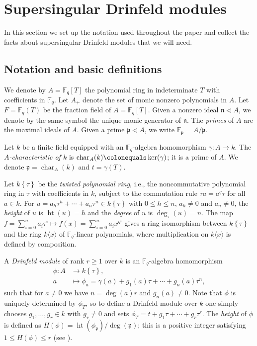 \documentclass[12pt]{amsart}
\theoremstyle{definition}
\theoremstyle{remark}
\numberwithin{equation}{section}
\numberwithin{thm}{section}
\DeclareMathOperator{\Ht}{ht}
\DeclareMathOperator{\chr}{char}
\newcommand{\fn}{\mathfrak{n}}
\newcommand{\fp}{\mathfrak{p}}
\newcommand{\F}{\mathbb{F}}
\newcommand{\To}{\longrightarrow}
\newcommand{\twist}[1]{#1\!\left\{\tau\right\}}
\newcommand{\atwist}[2]{#1\langle#2\rangle}
\begin{document}
	
	\section{Supersingular Drinfeld modules}\label{sSupersingular}
	
	In this section we set up the notation used throughout the paper and collect the facts about supersingular Drinfeld modules that we will need. 
	
	\subsection{Notation and basic definitions}\label{ssNotation}
	We denote by $A=\F_q[T]$ the polynomial ring in indeterminate $T$ with coefficients in $\F_q$.  Let $A_+$
	denote the set of monic nonzero polynomials in $A$.
	Let $F=\F_q(T)$ be the fraction field of $A=\F_q[T]$.
	Given a nonzero ideal $\fn\lhd A$, we denote by the same symbol
	the unique monic generator of $\fn$. The \textit{primes} of $A$ are the maximal ideals of $A$.
	Given a prime $\fp\lhd A$, we write $\F_\fp=A/\fp$.
	
	Let $k$ be a finite field equipped with an $\F_q$-algebra homomorphism $\gamma\colon A\to k$. The \textit{$A$-characteristic of $k$} is
	$\chr_A(k)\colonequals \ker(\gamma)$; it is a prime of $A$. We denote $\fp=\chr_A(k)$ and $t=\gamma(T)$.
	
	Let $\twist{k}$ be the \textit{twisted polynomial ring}, i.e., the noncommutative
	polynomial ring in $\tau$ with coefficients in $k$, subject to the commutation rule $\tau a=a^q\tau$ for all $a\in k$. 
	For $u=a_h\tau^h+\cdots +a_n\tau^n\in \twist{k}$ with $0\leq h\leq n$, $a_h\neq 0$ and $a_n\neq 0$, the \textit{height} of $u$ is $\Ht(u)=h$ and the \textit{degree} of $u$ is $\deg_\tau(u)=n$.  
	The map $f=\sum_{i=0}^n a_i \tau^i \longmapsto f(x)=\sum_{i=0}^n a_i x^{q^i}$ gives a ring isomorphism between $\twist{k}$
	and the ring $\atwist{k}{x}$ of $\F_q$-linear polynomials, where multiplication on $\atwist{k}{x}$ is defined by composition.
	
	A \textit{Drinfeld module} of rank $r\geq 1$ over $k$ is an $\F_q$-algebra homomorphism
	\begin{align*}
		\phi\colon A &\To \twist{k}, \\
		a &\longmapsto \phi_a=\gamma(a)+g_1(a)\tau+\cdots +g_n(a)\tau^n,
	\end{align*}
	such that for $a\neq 0$ we have $n=\deg(a) r$ and $g_n(a)\neq 0$. Note that
	$\phi$ is uniquely determined by $\phi_T$, so to define a Drinfeld module over $k$
	one simply chooses $g_1, \dots, g_r\in k$ with $g_r\neq 0$ and sets $\phi_T=t+g_1\tau+\cdots+g_r\tau^r$.
	The \textit{height} of $\phi$ is defined as $H(\phi)=\Ht(\phi_\fp)/\deg(\fp)$; this is a positive
	integer satisfying $1\leq H(\phi)\leq r$ (see \cite[Lem.\ 3.2.11]{PapikianGTM}).
	
\end{document}
